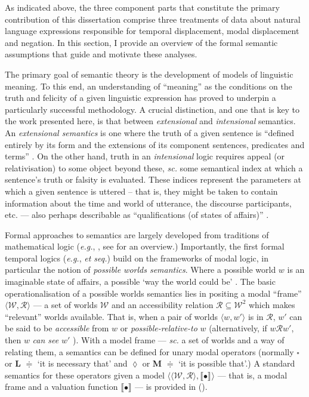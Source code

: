 \documentclass[11pt,dvipsnames]{report}
\providecommand{\denote}[2][]{\ensuremath{\llbracket{#2}\rrbracket^{#1}}}
\begin{document}
As indicated above, the three component parts that constitute the primary contribution of this dissertation comprise three treatments of data about natural language expressions responsible for temporal displacement, modal displacement and negation. In this section, I provide an overview of the formal semantic assumptions that guide and motivate these analyses.


The primary goal of semantic theory is the development of models of linguistic meaning. To this end, an understanding of ``meaning'' as the conditions on the truth and felicity of a given linguistic expression has proved to underpin a particularly successful methodology. A crucial distinction, and one that is key to the work presented here, is that between \textit{extensional} and \textit{intensional} semantics. An \textit{extensional semantics} is one where the truth of a given sentence is ``defined entirely by its form and the extensions of its component sentences, predicates and terms'' \citep{Menzel2017}. On the other hand, truth in an \textit{intensional} logic requires appeal (or relativisation) to some object beyond these, \textit{sc.} some semantical index at which a sentence's truth or falsity is evaluated. These indices represent the parameters at which a given sentence is uttered -- that is, they might be taken to contain information about the time and world of utterance, the discourse participants, etc. --- also perhaps describable as ``qualifications (of states of affairs)'' \citep{Nuyts2005}.

Formal approaches to semantics are largely developed from traditions of mathematical logic (\textit{e.g.}, \citealp{Montague1970}, see \citealp{Janssen2016} for an overview.) Importantly, the first formal temporal logics (\textit{e.g.}, \citealp{Prior1957} \textit{et seq.}) build on the frameworks of modal logic, in particular the notion of \textit{possible worlds semantics}. Where a possible world $ w $ is an imaginable state of affairs, a possible `way the world could be' \citep[\textit{e.g.},][]{Lewis1986}. The basic operationalisation of a possible worlds semantics lies in positing a modal ``frame'' $ \langle\mathcal{W,R}\rangle $ --- a set of worlds $ \mathcal W $ and an accessibility relation $ \mathcal{R\subseteq W}^2$ which makes ``relevant'' worlds available. That is, when a pair of worlds $\langle w,w' \rangle$ is in $ \mathcal R $, $ w' $ can be said to be \textit{accessible} from $ w $ or \textit{possible-relative-to} $ w $ (alternatively, if $ w\mathcal Rw' $, then $ w $ \textit{can see} $ w' $ \citep[37]{HC1996}). With a model frame --- \textit{sc.} a set of worlds and a way of relating them, a semantics can be defined for unary modal operators (normally $ \square $ or \textbf{L} $ \doteqdot $ `it is necessary that' and $ \lozenge $ or \textbf{M} $ \doteqdot $ `it is possible that'.) A standard semantics for these operators given a model $ \langle\mathcal{\langle W,R\rangle},\denote{•}\rangle $ --- that is, a modal frame and a valuation function \denote{•} --- is provided in (\nextx).
\end{document}

